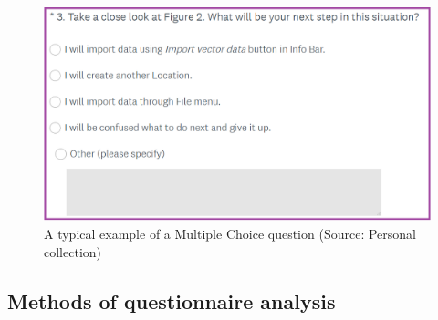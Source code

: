\documentclass[a4paper,10pt,twoside]{article}
\begin{document}
\vspace{0.3cm}
\begin{figure}[hbt!] 
\begin{center}
\includegraphics[width=14cm]{../pictures/multiple_choice_question.png} 
\caption[A typical example of a Multiple Choice question]{A typical example of a Multiple Choice question (Source: Personal collection)}
\label{fig:multiple_choice_question}
\end{center}
\end{figure}

\subsection{Methods of questionnaire analysis}
\label{sec:qstat}
\end{document}
